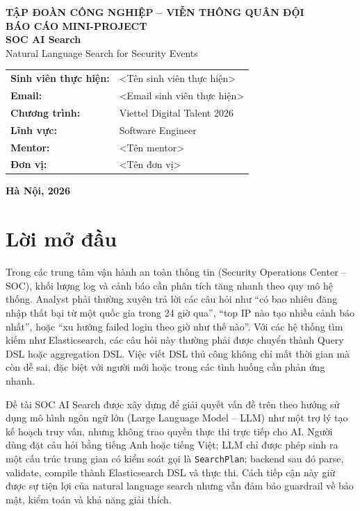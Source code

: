 \documentclass[12pt,a4paper]{report}
\newcommand{\ProjectTitle}{SOC AI Search}
\newcommand{\ProjectSubtitle}{Natural Language Search for Security Events}
\newcommand{\StudentName}{<Tên sinh viên thực hiện>}
\newcommand{\StudentEmail}{<Email sinh viên thực hiện>}
\newcommand{\MentorName}{<Tên mentor>}
\newcommand{\UnitName}{<Tên đơn vị>}
\newcommand{\ProgramName}{Viettel Digital Talent 2026}
\newcommand{\TrackName}{Software Engineer}
\begin{document}
\begin{titlepage}
    \begin{center}
        {\bfseries TẬP ĐOÀN CÔNG NGHIỆP -- VIỄN THÔNG QUÂN ĐỘI}\\[0.5cm]
        {\bfseries \Large BÁO CÁO MINI-PROJECT}\\[2.0cm]

        {\bfseries \LARGE \ProjectTitle}\\[0.3cm]
        {\Large \ProjectSubtitle}\\[2.0cm]

        \begin{tabular}{>{\bfseries}p{5cm}p{8cm}}
            Sinh viên thực hiện: & \StudentName \\
            Email: & \StudentEmail \\
            Chương trình: & \ProgramName \\
            Lĩnh vực: & \TrackName \\
            Mentor: & \MentorName \\
            Đơn vị: & \UnitName \\
        \end{tabular}

        \vfill
        {\bfseries Hà Nội, 2026}
    \end{center}
\end{titlepage}


\chapter*{Lời mở đầu}

Trong các trung tâm vận hành an toàn thông tin (Security Operations Center -- SOC), khối lượng log và cảnh báo cần phân tích tăng nhanh theo quy mô hệ thống. Analyst phải thường xuyên trả lời các câu hỏi như ``có bao nhiêu đăng nhập thất bại từ một quốc gia trong 24 giờ qua'', ``top IP nào tạo nhiều cảnh báo nhất'', hoặc ``xu hướng failed login theo giờ như thế nào''. Với các hệ thống tìm kiếm như Elasticsearch, các câu hỏi này thường phải được chuyển thành Query DSL hoặc aggregation DSL. Việc viết DSL thủ công không chỉ mất thời gian mà còn dễ sai, đặc biệt với người mới hoặc trong các tình huống cần phản ứng nhanh.

Đề tài \ProjectTitle{} được xây dựng để giải quyết vấn đề trên theo hướng sử dụng mô hình ngôn ngữ lớn (Large Language Model -- LLM) như một trợ lý tạo kế hoạch truy vấn, nhưng không trao quyền thực thi trực tiếp cho AI. Người dùng đặt câu hỏi bằng tiếng Anh hoặc tiếng Việt; LLM chỉ được phép sinh ra một cấu trúc trung gian có kiểm soát gọi là \texttt{SearchPlan}; backend sau đó parse, validate, compile thành Elasticsearch DSL và thực thi. Cách tiếp cận này giữ được sự tiện lợi của natural language search nhưng vẫn đảm bảo guardrail về bảo mật, kiểm toán và khả năng giải thích.
\end{document}
